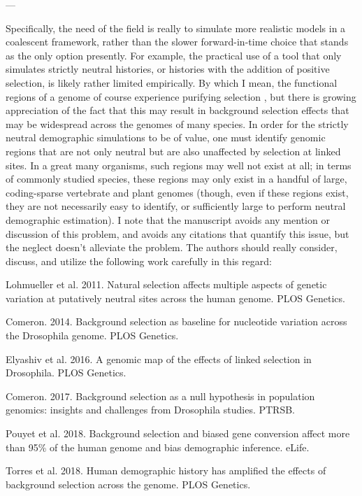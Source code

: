 \documentclass[11pt]{article}
\newcounter{reviewer}
\newcounter{point}[reviewer]
\renewcommand{\thepoint}{\thereviewer.\arabic{point}}
\newenvironment{point}
   {\refstepcounter{point} \bigskip \noindent {\textbf{Reviewer~Point~\thepoint} } ---\ }
   {\par }
\begin{document}
\begin{point}

Specifically, the need of the field is really to simulate more realistic models
in a coalescent framework, rather than the slower forward-in-time choice that
stands as the only option presently. For example, the practical use of a tool
that only simulates strictly neutral histories, or histories with the addition
of positive selection, is likely rather limited empirically. By which I mean,
the functional regions of a genome of course experience purifying selection ,
but there is growing appreciation of the fact that this may result in
background selection effects that may be widespread across the genomes of many
species. In order for the strictly neutral demographic simulations to be of
value, one must identify genomic regions that are not only neutral but are also
unaffected by selection at linked sites. In a great many organisms, such
regions may well not exist at all; in terms of commonly studied species, these
regions may only exist in a handful of large, coding-sparse vertebrate and
plant genomes (though, even if these regions exist, they are not necessarily
easy to identify, or sufficiently large to perform neutral demographic
estimation). I note that the manuscript avoids any mention or discussion of
this problem, and avoids any citations that quantify this issue, but the
neglect doesn't alleviate the problem. The authors should really consider,
discuss, and utilize the following work carefully in this regard:

Lohmueller et al. 2011. Natural selection affects multiple aspects of genetic
variation at putatively neutral sites across the human genome. PLOS Genetics.

Comeron. 2014. Background selection as baseline for nucleotide variation across
the Drosophila genome. PLOS Genetics.

Elyashiv et al. 2016. A genomic map of the effects of linked selection in
Drosophila. PLOS Genetics.

Comeron. 2017. Background selection as a null hypothesis in population
genomics: insights and challenges from Drosophila studies. PTRSB.

Pouyet et al. 2018. Background selection and biased gene conversion affect more
than 95\% of the human genome and bias demographic inference. eLife.

Torres et al. 2018. Human demographic history has amplified the effects of
background selection across the genome. PLOS Genetics.


\end{point}
\end{document}
